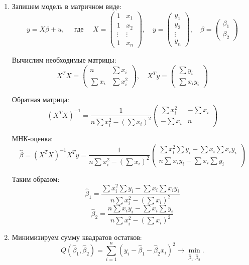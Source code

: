 \documentclass[12pt]{article}
\newcommand{\hb}{\hat{\beta}}
\begin{document}
\begin{sol}
\begin{enumerate}
\item Запишем модель в матричном виде:
\[ y = X\beta + u, \quad
\text{ где }
\quad
X = \begin{pmatrix}
1 & x_1 \\
1 & x_2 \\
\vdots & \vdots \\
1 & x_n
\end{pmatrix}, \quad
y = \begin{pmatrix}
y_1 \\
y_2 \\
\vdots \\
y_n
\end{pmatrix}, \quad
\beta = \begin{pmatrix}
\beta_1 \\
\beta_2
\end{pmatrix}
\]

Вычислим необходимые матрицы:
\[
X^TX = \begin{pmatrix}
n & \sum x_i \\
\sum x_i & \sum x_i^2
\end{pmatrix}, \quad
X^Ty = \begin{pmatrix}
\sum y_i \\
\sum x_i y_i
\end{pmatrix}
\]

Обратная матрица:
\[
(X^TX)^{-1} = \frac{1}{n\sum x_i^2 - (\sum x_i)^2}
\begin{pmatrix}
\sum x_i^2 & -\sum x_i \\
-\sum x_i & n
\end{pmatrix}
\]

МНК-оценка:
\[
\hat{\beta} = (X^TX)^{-1}X^Ty = \frac{1}{n\sum x_i^2 - (\sum x_i)^2}
\begin{pmatrix}
\sum x_i^2 \sum y_i - \sum x_i \sum x_i y_i \\
n \sum x_i y_i - \sum x_i \sum y_i
\end{pmatrix}
\]

Таким образом:
\[
\hat{\beta}_1 = \frac{\sum x_i^2 \sum y_i - \sum x_i \sum x_i y_i}{n\sum x_i^2 - (\sum x_i)^2}
\]
\[
\hat{\beta}_2 = \frac{n \sum x_i y_i - \sum x_i \sum y_i}{n\sum x_i^2 - (\sum x_i)^2}
\]

\item Минимизируем сумму квадратов остатков:
\[
Q(\hat{\beta}_1, \hat{\beta}_2) = \sum_{i=1}^n (y_i - \hat{\beta}_1 - \hat{\beta}_2 x_i)^2 \to \underset{\hb_1, \hb_2}{\min}.
\]


\end{enumerate}
\end{sol}
\end{document}

